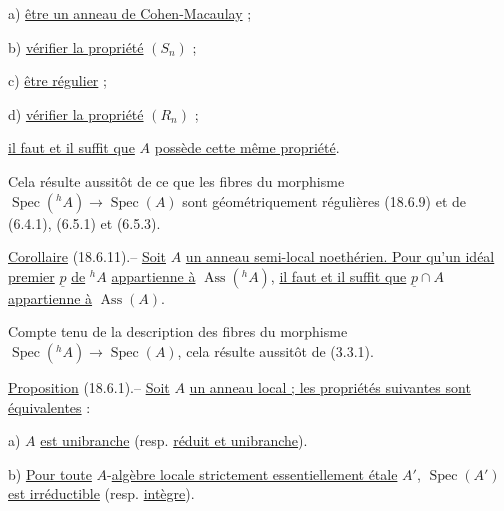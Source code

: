 a) \uline{être un anneau de Cohen-Macaulay} ;

b) \uline{vérifier la propriété} $(S_n)$ ;

c) \uline{être régulier} ;

d) \uline{vérifier la propriété} $(R_n)$ ;


\uline{il faut et il suffit que} $A$ \uline{possède cette même propriété}.

Cela résulte aussitôt de ce que les fibres du morphisme $\operatorname{Spec}({}^h A)\to\operatorname{Spec}(A)$ sont géométriquement régulières (18.6.9) et de (6.4.1), (6.5.1) et (6.5.3).

\uline{Corollaire} (18.6.11).-- \uline{Soit} $A$ \uline{un anneau semi-local noethérien. Pour qu'un idéal premier} $\underline p$ \uline{de} ${}^h A$ \uline{appartienne à} $\operatorname{Ass}({}^h A)$, \uline{il faut et il suffit que} $\underline p\cap A$ \uline{appartienne à} $\operatorname{Ass}(A)$.

Compte tenu de la description des fibres du morphisme $\operatorname{Spec}({}^h A)\to\operatorname{Spec}(A)$, cela résulte aussitôt de (3.3.1).

\uline{Proposition} (18.6.1).-- \uline{Soit} $A$ \uline{un anneau local ; les propriétés suivantes sont équivalentes} :

a) $A$ \uline{est unibranche} (resp. \uline{réduit et unibranche}).

b) \uline{Pour toute} $A$-\uline{algèbre locale strictement essentiellement étale} $A'$,  $\operatorname{Spec}(A')$ \uline{est irréductible} (resp. \uline{intègre}).

